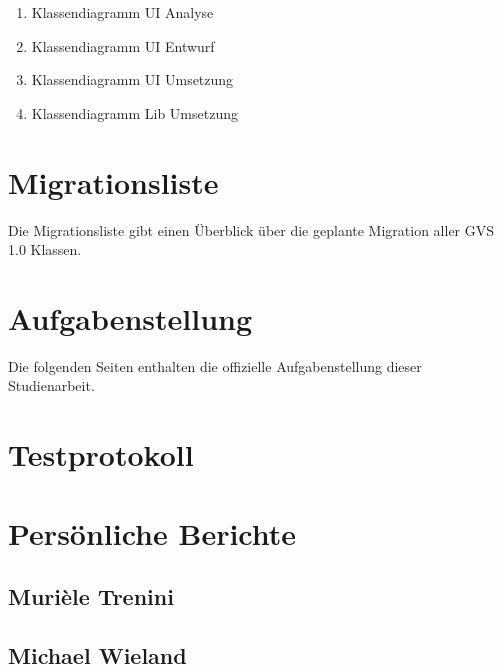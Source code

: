 \documentclass[11pt,a4paper,english,oneside]{book}
\numberwithin{equation}{chapter}
\begin{document}
	\begin{enumerate}
		\item Klassendiagramm UI Analyse
		\item Klassendiagramm UI Entwurf
		\item Klassendiagramm UI Umsetzung
		\item Klassendiagramm Lib Umsetzung
	\end{enumerate}
	
	
	
	
	
	
	\chapter{Migrationsliste} \label{ch:migration-list}
	Die Migrationsliste gibt einen Überblick über die geplante Migration aller GVS 1.0 Klassen.
	
	
	
	\chapter{Aufgabenstellung}
	\label{aufgabenstellung}
	Die folgenden Seiten enthalten die offizielle Aufgabenstellung dieser Studienarbeit.
	
	
	
	\chapter{Testprotokoll} \label{Testprotokoll}
	
	
	
	\chapter{Persönliche Berichte}
	\label{erfahrungsberichte}
	
	\section{Murièle Trenini}
	
	\section{Michael Wieland}
	
\end{document}
